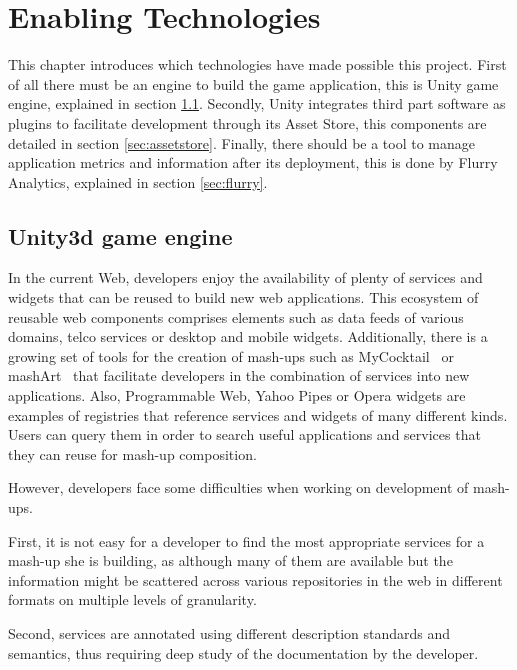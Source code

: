 
\chapter{Enabling Technologies}
\label{chap:enabling_technologies}
\begin{chapterintro}
This chapter introduces which technologies have made possible this project. First of all there must be an engine to build the game application, this is Unity game engine, explained in section \ref{sec:unity}. Secondly, Unity integrates third part software as plugins to facilitate development through its Asset Store, this components are detailed in section \ref{sec:assetstore}. Finally, there should be a tool to manage application metrics and information after its deployment, this is done by Flurry Analytics, explained in section \ref{sec:flurry}.
\end{chapterintro}

\cleardoublepage
\section{Unity3d game engine}
\label{sec:unity}
In the current Web, developers enjoy the availability of plenty of services and widgets that can be reused to build new web applications. This ecosystem of reusable web components comprises elements such as data feeds of various domains, telco services or desktop and mobile widgets. Additionally, there is a growing set of tools for the creation of mash-ups such as MyCocktail~\cite{iglesias2011combining} or mashArt~\cite{daniel2009hosted} that facilitate developers in the combination of services into new applications. Also, Programmable Web, Yahoo Pipes or Opera widgets are examples of registries that reference services and widgets of many different kinds. Users can query them in order to search useful applications and services that they can reuse for mash-up composition.

However, developers face some difficulties when working on development of mash-ups. 

First, it is not easy for a developer to find the most appropriate services for a mash-up she is building, as although many of them are available but the information might be scattered across various repositories in the web in different formats on multiple levels of granularity.

Second, services are annotated using different description standards and semantics, thus requiring deep study of the documentation by the developer.

